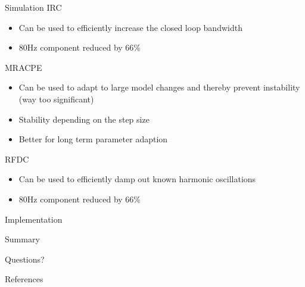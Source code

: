 \documentclass[10pt]{beamer}
\begin{document}
\begin{frame}{Simulation}
  IRC
  \begin{itemize}
    \item  Can be used to efficiently increase the closed loop bandwidth
    \item  80Hz component reduced by 66\%
  \end{itemize}
  MRACPE
  \begin{itemize}
    \item Can be used to adapt to large model changes and thereby prevent instability (way too significant)
    \item Stability depending on the step size
    \item Better for long term parameter adaption
  \end{itemize}
  RFDC
  \begin{itemize}
    \item Can be used to efficiently damp out known harmonic oscillations
    \item 80Hz component reduced by 66\%
  \end{itemize}
\end{frame}

\begin{frame}{Implementation}

\end{frame}

\begin{frame}{Summary}

\end{frame}

\begin{frame}[standout]
  Questions?
\end{frame}

\appendix

\begin{frame}[allowframebreaks]{References}

  
  

\end{frame}
\end{document}
